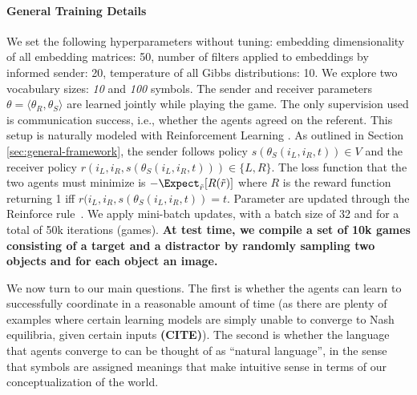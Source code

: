 \paragraph{General Training Details} We set the following
hyperparameters without tuning: embedding dimensionality of all embedding matrices: 50, number of filters applied to embeddings by
  informed sender: 20, temperature of all Gibbs distributions: 10. We explore two vocabulary sizes: \emph{10} and
\emph{100} symbols. The sender and receiver parameters $\theta=\langle
\theta_{R}, \theta_{S}\rangle$ are learned jointly while playing the
game. The only supervision used is communication success, i.e.,
whether the agents agreed on the referent. This setup is naturally
modeled with Reinforcement Learning \citep{Sutton:Barto:1998}. As
outlined in Section \ref{sec:general-framework}, the sender follows policy $s(\theta_S (i_L, i_R, t))\in V$ and the receiver policy $r(i_L, i_R, s(\theta_S (i_L, i_R, t))) \in \lbrace L, R \rbrace$. The loss function that the two agents must minimize is  $-\Expect_{\tilde{r}} [R(\tilde{r})]$ where $R$ is the reward function returning 1 iff $r(i_L, i_R, s(\theta_S (i_L, i_R, t)) = t$. %
Parameter are updated through the Reinforce rule~\cite{Williams:1992}.
We apply mini-batch updates, with a batch size of 32 and for a total of
50k iterations (games).  \textbf{At test time, we compile a set of 10k games  consisting of a target and a distractor by randomly sampling two objects and for each object an image.}

We now turn to our main questions. The first is whether the agents can
learn to successfully coordinate in a reasonable amount of time (as
there are plenty of examples where certain learning models are simply
unable to converge to Nash equilibria, given certain inputs
\textbf{(CITE)}). The second is whether the language that agents
converge to can be thought of as ``natural language'', in the sense
that symbols are assigned meanings that make intuitive sense in terms
of our conceptualization of the world.








